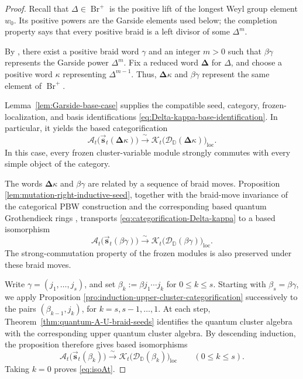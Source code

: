 \documentclass[12pt, reqno]{amsart}
\theoremstyle{plain}
\theoremstyle{definition}
\numberwithin{equation}{section}
\newcommand{\DD}{\mathbb{D}}
\newcommand{\Br}{{\operatorname{Br}}}
\begin{document}
\begin{proof}
Recall that \(\Delta\in\Br^+\) is the positive lift of the longest Weyl
group element \(w_0\). Its positive powers are the Garside elements used
below; the completion property says that every positive braid is a left
divisor of some \(\Delta^m\).

By \cite[Corollary~7.3]{oh2025pbw}, there exist a positive braid word
\(\gamma\) and an integer \(m>0\) such that \(\beta\gamma\) represents
the Garside power \(\Delta^m\). Fix a reduced word
\(\boldsymbol{\Delta}\) for \(\Delta\), and choose a positive word
\(\kappa\) representing \(\Delta^{m-1}\). Thus,
\(\boldsymbol{\Delta}\kappa\) and \(\beta\gamma\) represent the same
element of \(\Br^+\).

Lemma~\ref{lem:Garside-base-case} supplies the compatible seed,
category, frozen-localization, and basis identifications
\eqref{eq:Delta-kappa-base-identification}. In particular, it yields
the based categorification
\begin{equation}\label{eq:categorification-Delta-kappa}
    \mathcal A_t\bigl(
        \overrightarrow{\mathbf s}_t
        (\boldsymbol{\Delta}\kappa)
    \bigr)
    \xrightarrow{\ \sim\ }
    \mathcal{K}_t\bigl(
        \mathscr D_{\DD}(\boldsymbol{\Delta}\kappa)
    \bigr)_{\mathrm{loc}}.
\end{equation}
In this case, every frozen cluster-variable module strongly commutes
with every simple object of the category.

The words \(\boldsymbol{\Delta}\kappa\) and \(\beta\gamma\) are
related by a sequence of braid moves. Proposition
\ref{lem:mutation-right-inductive-seed}, together with the
braid-move invariance of the categorical PBW construction and the
corresponding based quantum Grothendieck rings
\cite{kashiwara2025monoidal}, transports
\eqref{eq:categorification-Delta-kappa} to a based isomorphism
\begin{equation}\label{eq:categorification-beta-gamma}
    \mathcal A_t\bigl(\overrightarrow{\mathbf s}_t(\beta\gamma)\bigr)
    \xrightarrow{\ \sim\ }
    \mathcal{K}_t\bigl(
        \mathscr D_{\DD}(\beta\gamma)
    \bigr)_{\mathrm{loc}}.
\end{equation}
The strong-commutation property of the frozen modules is also
preserved under these braid moves.

Write \(\gamma=(j_1,\ldots,j_s)\), and set
\(\beta_k:=\beta j_1\cdots j_k\) for \(0\leq k\leq s\). Starting with
\(\beta_s=\beta\gamma\), we apply Proposition
\ref{pro:induction-upper-cluster-categorification} successively to
the pairs \((\beta_{k-1},j_k)\), for \(k=s,s-1,\ldots,1\). At each
step, Theorem~\ref{thm:quantum-A-U-braid-seeds} identifies the quantum
cluster algebra with the corresponding upper quantum cluster algebra. By
descending induction, the proposition therefore gives
based isomorphisms
\begin{equation*}
    \mathcal A_t\bigl(\overrightarrow{\mathbf s}_t(\beta_k)\bigr)
    \xrightarrow{\ \sim\ }
    \mathcal{K}_t\bigl(\mathscr D_{\DD}(\beta_k)\bigr)_{\mathrm{loc}}
    \qquad (0\leq k\leq s).
\end{equation*}
Taking \(k=0\) proves \eqref{eq:isoAt}.


\end{proof}
\end{document}
